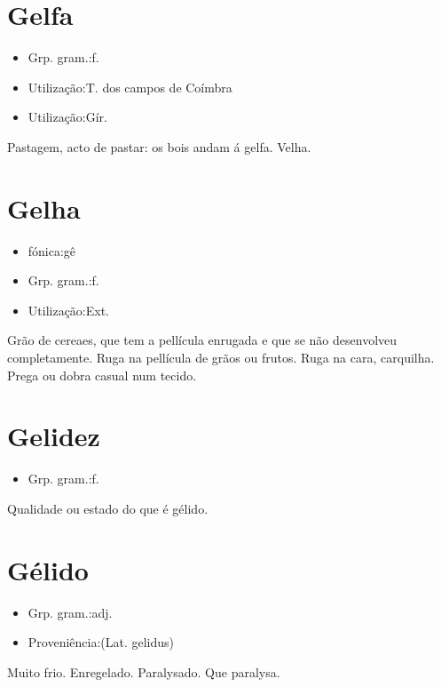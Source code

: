 \section{Gelfa}
\begin{itemize}
\item {Grp. gram.:f.}
\end{itemize}
\begin{itemize}
\item {Utilização:T. dos campos de Coímbra}
\end{itemize}
\begin{itemize}
\item {Utilização:Gír.}
\end{itemize}
Pastagem, acto de pastar: \textunderscore os bois andam á gelfa\textunderscore .
Velha.
\section{Gelha}
\begin{itemize}
\item {fónica:gê}
\end{itemize}
\begin{itemize}
\item {Grp. gram.:f.}
\end{itemize}
\begin{itemize}
\item {Utilização:Ext.}
\end{itemize}
Grão de cereaes, que tem a pellícula enrugada e que se não desenvolveu completamente.
Ruga na pellícula de grãos ou frutos.
Ruga na cara, carquilha.
Prega ou dobra casual num tecido.
\section{Gelidez}
\begin{itemize}
\item {Grp. gram.:f.}
\end{itemize}
Qualidade ou estado do que é gélido.
\section{Gélido}
\begin{itemize}
\item {Grp. gram.:adj.}
\end{itemize}
\begin{itemize}
\item {Proveniência:(Lat. \textunderscore gelidus\textunderscore )}
\end{itemize}
Muito frio.
Enregelado.
Paralysado.
Que paralysa.
